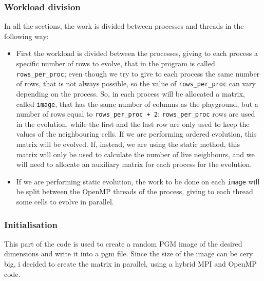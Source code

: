 \documentclass[12pt]{article}
\begin{document}
    \subsubsection{Workload division}
    \label{sect:workload_division}
    In all the sections, the work is divided between processes and threads in the following way:
    \begin{itemize}
        \item First the workload is divided between the processes, giving to each process a specific number of rows to evolve, that in the program is called \lstinline|rows_per_proc|; even though we try to give to each process the same number of rows, that is not always possible, so the value of \lstinline|rows_per_proc| can vary depending on the process.\newline
        So, in each process will be allocated a matrix, called \lstinline|image|, that has the same number of columns as the playground, but a number of rows equal to \lstinline|rows_per_proc + 2|: \lstinline|rows_per_proc| rows are used in the evolution, while the first and the last row are only used to keep the values of the neighbouring cells.\newline
        If we are performing ordered evolution, this matrix will be evolved. If, instead, we are using the static method, this matrix will only be used to calculate the number of live neighbours, and we will need to allocate an auxiliary matrix for each process for the evolution.
        \item If we are performing static evolution, the work to be done on each \lstinline|image| will be split between the OpenMP threads of the process, giving to each thread some cells to evolve in parallel.
    \end{itemize}
    
    
    \subsubsection{Initialisation}
    This part of the code is used to create a random PGM image of the desired dimensions and write it into a pgm file. Since the size of the image can be cery big, i decided to create the matrix in parallel, using a hybrid MPI and OpenMP code.
    
\end{document}
